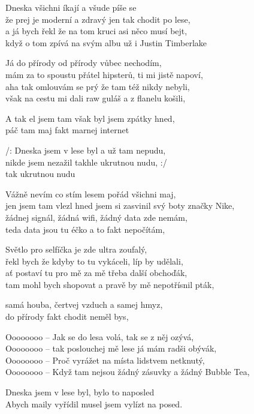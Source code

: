 \pagestyle{empty}

\vspace{-2 pt}
\ve{}
Dneska všichni íkají a všude píše se\\
že prej je moderní a zdravý jen tak chodit po lese,\\
a já bych řekl že na tom kruci asi něco musí bejt,\\
když o tom zpívá na svým albu už i Justin Timberlake 

\ve{}
Já do přírody od přírody vůbec nechodím,\\
mám za to spoustu přátel hipsterů, ti mi jistě napoví,\\
aha tak omlouvám se prý že tam též nikdy nebyli,\\
však na cestu mi dali raw guláš a z flanelu košili,

\re{*:}
A tak el jsem tam však byl jsem zpátky hned,\\
páč tam maj fakt marnej internet 

\cho{}
/: Dneska jsem v lese byl a už tam nepudu,\\
nikde jsem nezažil takhle ukrutnou nudu, :/\\
tak ukrutnou nudu

\ve{}
Vážně nevím co stím lesem pořád všichni maj,\\
jen jsem tam vlezl hned jsem si zasvinil svý boty značky Nike,\\
žádnej signál, žádná wifi, žádný data zde nemám,\\
teda data jsou tu éčko a to fakt nepočítám, 

\ve{}
Světlo pro selfíčka je zde ultra zoufalý,\\
řekl bych že kdyby to tu vykáceli, líp by udělali,\\
ať postaví tu pro mě za mě třeba další obchoďák,\\
tam mohl bych shopovat a pravě by mě nepotřísnil pták, 

\re{*:}
samá houba, čertvej vzduch a samej hmyz,\\
do přírody fakt chodit neměl bys, 

\cho{}

\ve{}
Oooooooo -- Jak se do lesa volá, tak se z něj ozývá,\\
Oooooooo -- tak poslouchej mě lese já mám radši obývák,\\
Oooooooo -- Proč vyrážet na místa lidstvem netknutý,\\
Oooooooo -- Když tam nejsou žádný zásuvky a žádný Bubble Tea, 

\cho{}
Dneska jsem v lese byl, bylo to naposled\\
Abych maily vyřídil musel jsem vylízt na posed.

\cho{}

\esong
\pagestyle{plain}
\restoregeometry